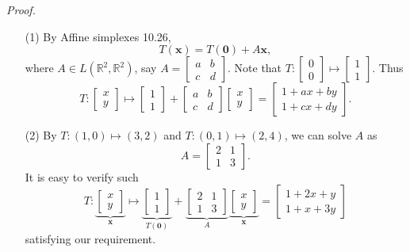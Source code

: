 \documentclass{article}
\begin{document}
\emph{Proof.}
\begin{enumerate}
\item[(1)]
  By Affine simplexes 10.26,
  \[
    T(\mathbf{x}) = T(\mathbf{0}) + A\mathbf{x},
  \]
  where $A \in L(\mathbb{R}^2, \mathbb{R}^2)$, say
  $A = \begin{bmatrix}
    a & b \\
    c & d
  \end{bmatrix}$.
  Note that $T:
  \begin{bmatrix}
    0 \\
    0
  \end{bmatrix} \mapsto
  \begin{bmatrix}
    1 \\
    1
  \end{bmatrix}$.
  Thus
  \[
    T:
    \begin{bmatrix}
      x \\
      y
    \end{bmatrix} \mapsto
    \begin{bmatrix}
      1 \\
      1
    \end{bmatrix}
    +
    \begin{bmatrix}
      a & b \\
      c & d
    \end{bmatrix}
    \begin{bmatrix}
      x \\
      y
    \end{bmatrix}
    =
    \begin{bmatrix}
      1+ax+by \\
      1+cx+dy
    \end{bmatrix}.
  \]

\item[(2)]
  By $T: (1,0) \mapsto (3,2)$ and $T: (0,1) \mapsto (2,4)$,
  we can solve $A$ as
  \[
    A = \begin{bmatrix}
      2 & 1 \\
      1 & 3
    \end{bmatrix}.
  \]
  It is easy to verify such
  \[
    T:
    \underbrace{\begin{bmatrix}
      x \\
      y
    \end{bmatrix}}_{\mathbf{x}}
    \mapsto
    \underbrace{\begin{bmatrix}
      1 \\
      1
    \end{bmatrix}}_{T(\mathbf{0})}
    +
    \underbrace{\begin{bmatrix}
      2 & 1 \\
      1 & 3
    \end{bmatrix}}_{A}
    \underbrace{\begin{bmatrix}
      x \\
      y
    \end{bmatrix}}_{\mathbf{x}}
    =
    \begin{bmatrix}
      1+2x+y \\
      1+x+3y
    \end{bmatrix}
  \]
  satisfying our requirement.


\end{enumerate}
\end{document}
